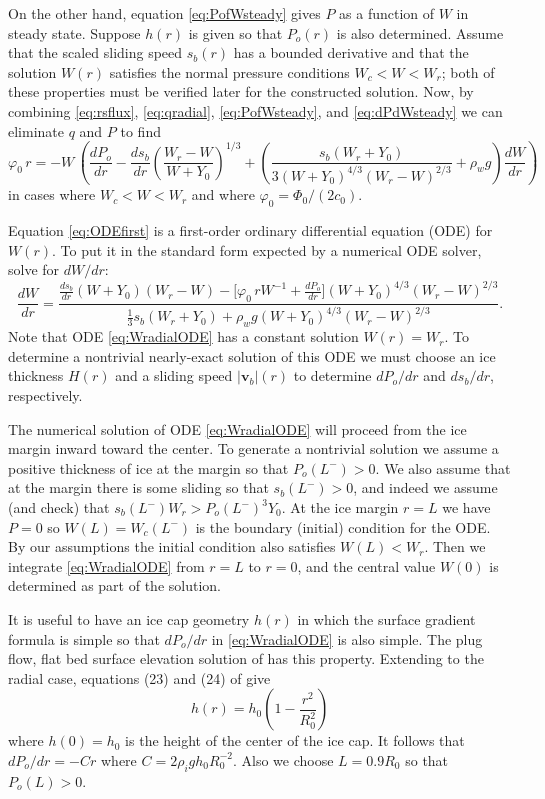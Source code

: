 \documentclass[11pt,final]{amsart}%
\newcommand\bv{\mathbf{v}}
\begin{document}
On the other hand, equation \eqref{eq:PofWsteady} gives $P$ as a function of $W$ in steady state.  Suppose $h(r)$ is given so that $P_o(r)$ is also determined.  Assume that the scaled sliding speed $s_b(r)$ has a bounded derivative and that the solution $W(r)$ satisfies the normal pressure conditions $W_c < W < W_r$; both of these properties must be verified later for the constructed solution.  Now, by combining \eqref{eq:rsflux}, \eqref{eq:qradial}, \eqref{eq:PofWsteady}, and \eqref{eq:dPdWsteady} we can eliminate $q$ and $P$ to find
\begin{equation}
\varphi_0\, r = - W\, \left(\frac{dP_o}{dr} - \frac{ds_b}{dr} \left(\frac{W_r - W}{W+Y_0}\right)^{1/3} + \left(\frac{s_b (W_r + Y_0)}{3 (W+Y_0)^{4/3} (W_r - W)^{2/3}} + \rho_w g\right) \frac{dW}{dr}\right)  \label{eq:ODEfirst}
\end{equation}
in cases where $W_c < W < W_r$ and where $\varphi_0 = \Phi_0 / (2 c_0)$. 

Equation \eqref{eq:ODEfirst} is a first-order ordinary differential equation (ODE) for $W(r)$.  To put it in the standard form expected by a numerical ODE solver, solve for $dW/dr$:
\begin{equation}
\frac{dW}{dr} = \frac{\frac{ds_b}{dr} (W+Y_0) (W_r - W) - \Big[\varphi_0\, r W^{-1} + \frac{dP_o}{dr}\Big] (W + Y_0)^{4/3} \left(W_r - W\right)^{2/3}}{\frac{1}{3} s_b (W_r + Y_0) + \rho_w g (W + Y_0)^{4/3} (W_r - W)^{2/3}}.
\label{eq:WradialODE}
\end{equation}
Note that ODE \eqref{eq:WradialODE} has a constant solution $W(r)=W_r$.  To determine a nontrivial nearly-exact solution of this ODE we must choose an ice thickness $H(r)$ and a sliding speed $|\bv_b|(r)$ to determine $dP_o/dr$ and $ds_b/dr$, respectively.

The numerical solution of ODE \eqref{eq:WradialODE} will proceed from the ice margin inward toward the center.  To generate a nontrivial solution we assume a positive thickness of ice at the margin so that $P_o(L^-)>0$.  We also assume that at the margin there is some sliding so that $s_b(L^-)>0$, and indeed we assume (and check) that $s_b(L^-) W_r > P_o(L^-)^3 Y_0$.  At the ice margin $r=L$ we have $P=0$ so $W(L)=W_c(L^-)$ is the boundary (initial) condition for the ODE.  By our assumptions the initial condition also satisfies $W(L) < W_r$.  Then we integrate \eqref{eq:WradialODE} from $r=L$ to $r=0$, and the central value $W(0)$ is determined as part of the solution.

It is useful to have an ice cap geometry $h(r)$ in which the surface gradient formula is simple so that $dP_o/dr$ in \eqref{eq:WradialODE} is also simple.  The plug flow, flat bed surface elevation solution of \cite{Bodvardsson} has this property.  Extending to the radial case, equations (23) and (24) of \citep{Bodvardsson} give
\begin{equation}
h(r) = h_0 \left(1 - \frac{r^2}{R_0^2} \right) \label{eq:choosebodvardssonh}
\end{equation}
where $h(0)=h_0$ is the height of the center of the ice cap.  It follows that $dP_o/dr = - C r$ where $C=2\rho_i g h_0 R_0^{-2}$.  Also we choose $L=0.9 R_0$ so that $P_o(L)>0$.
\end{document}
